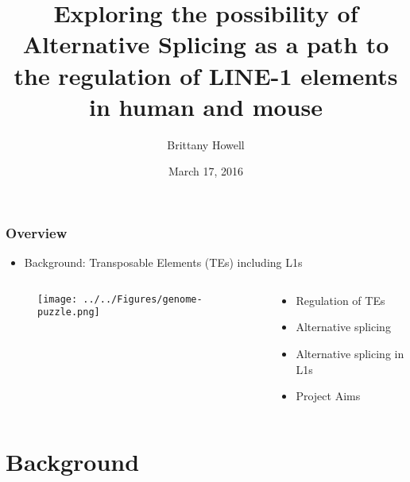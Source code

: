 \documentclass{beamer}
\title{Exploring the possibility of Alternative Splicing as a path to the regulation of LINE-1 elements in human and mouse}
\author{Brittany Howell}
\institute{Supervisors: Prof. Dave Adelson and Dr. Dan Kortschak}
\date{March 17, 2016}
\begin{document}
	
	\frame{\titlepage}

		\begin{frame} %
			
			\frametitle{Overview}
			
			\begin{itemize}
				\item Background: Transposable Elements (TEs) including L1s
			\end{itemize}
			\begin{columns}[c] %
				
				\begin{column}[T]{.6\textwidth}
					
					\begin{figure}
						\texttt{[image: ../../Figures/genome-puzzle.png]}
					\end{figure}
					
				\end{column}
			
			\begin{column}[T]{.55\textwidth}
				\begin{itemize}
					\item Regulation of TEs
					\item Alternative splicing
					\item Alternative splicing in L1s
					\item Project Aims
				\end{itemize}
			\end{column}
			
				
			
			\end{columns}
				\end{frame}
			
			\section[Background]{Background}
			
\end{document}
